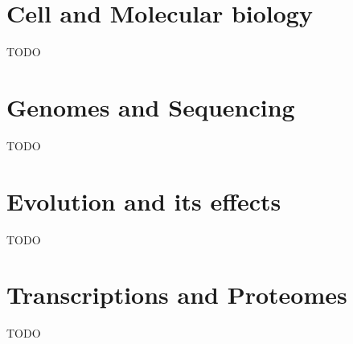 \documentclass[a4paper]{article}
\begin{document}
\tableofcontents

\section{Cell and Molecular biology}

TODO

\section{Genomes and Sequencing}

TODO

\section{Evolution and its effects}

TODO

\section{Transcriptions and Proteomes}

TODO
\end{document}

